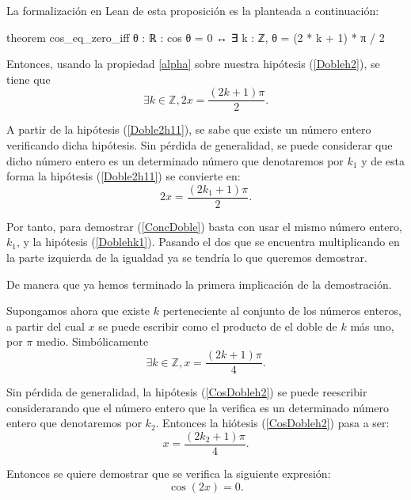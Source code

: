 \begin{demostracion}
  La formalización en Lean de esta proposición es la planteada
  a continuación:
  \begin{leancode}
    theorem cos_eq_zero_iff {θ : ℝ} : cos θ = 0 ↔
    ∃ k : ℤ, θ = (2 * k + 1) * π / 2
  \end{leancode}

  Entonces, usando la propiedad \ref{alpha} sobre nuestra
  hipótesis (\ref{Dobleh2}), se tiene que
  \begin{equation}\label{Doble2h11}
    ∃k∈ ℤ, 2x=\frac{(2k+1)π}{2}.
  \end{equation}

  A partir de la hipótesis (\ref{Doble2h11}), se sabe que existe
  un número entero verificando dicha hipótesis. Sin pérdida de
  generalidad, se puede considerar que dicho número entero es un
  determinado número que denotaremos por \(k_1\) y de esta forma
  la hipótesis (\ref{Doble2h11}) se convierte en:
  \begin{equation}\label{Doblehk1}\tag{hk1}
     2x=\frac{(2k_1+1)π}{2}.
  \end{equation}

  Por tanto, para demostrar (\ref{ConcDoble}) basta con usar
  el mismo número entero, \(k_1\), y la hipótesis
  (\ref{Doblehk1}). Pasando el dos que se encuentra multiplicando
  en la parte izquierda de la igualdad ya se tendría lo que
  queremos demostrar.

  De manera que ya hemos terminado la primera implicación de la
  demostración.

   \noindent
   \framebox{\longleftarrow} Supongamos ahora que existe \(k\)
   perteneciente al conjunto de los números enteros, a partir del
   cual \(x\) se puede escribir como el producto de el doble de
   \(k \) más uno, por \( π \) medio. Simbólicamente
   \begin{equation}\label{CosDobleh2}\tag{h2}
      ∃ k ∈ ℤ, x=\frac{(2k+1)π}{4}.
    \end{equation}

    Sin pérdida de generalidad, la hipótesis (\ref{CosDobleh2}) se
    puede reescribir considerarando que el número entero que la
    verifica es un determinado número entero que denotaremos
    por \(k_2\).
    Entonces la hiótesis (\ref{CosDobleh2}) pasa a ser:
    \begin{equation}\label{hk2}\tag{hk2}
       x=\frac{(2k_2+1)π}{4}.
    \end{equation}

    Entonces se quiere demostrar que se verifica la siguiente
    expresión:
    \begin{equation}\label{ConcDoble3}
      \cos(2x)=0.
    \end{equation}


\end{demostracion}
